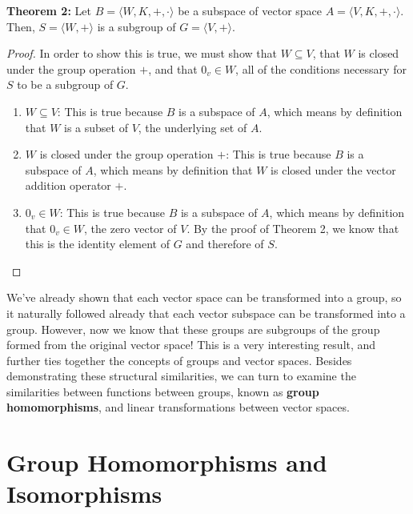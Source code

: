 \documentclass[twoside]{article}
\newcommand{\done}{\renewcommand\qedsymbol{$\blacksquare$}}
\begin{document}
\begin{spacing}{1.25}
\begin{mdframed}[roundcorner=10pt, backgroundcolor=gray!10]
  \textbf{Theorem 2:} Let $B=\langle W,K,+,\cdot\rangle$ be a subspace of 
    vector space $A=\langle V,K,+,\cdot\rangle$. Then, $S=\langle W,+ \rangle$ is a subgroup of
    $G=\langle V,+ \rangle$.
\end{mdframed}
\begin{proof}
    In order to show this is true, we must show that $W\subseteq V$, that 
    $W$ is closed under the group operation $+$, and that $0_v\in W$, 
    all of the conditions necessary for $S$ to be a subgroup of $G$. 
    \begin{enumerate}
      \item $W\subseteq V$: This is true because $B$ is a subspace of $A$, 
      which means by definition that $W$ is a subset of $V$, the underlying set of $A$.
      \item $W$ is closed under the group operation $+$: This is true because 
      $B$ is a subspace of $A$, which means by definition that $W$ is closed under
      the vector addition operator $+$.
      \item $0_v\in W$: This is true because $B$ is a subspace of $A$, which means by definition that
        $0_v\in W$, the zero vector of $V$. By the proof of Theorem 2, we know that 
        this is the identity element of $G$ and therefore of $S$. 
    \end{enumerate}
\done     
\end{proof}

We've already shown that each vector space can be transformed into a group,
so it naturally followed already that each vector subspace can be transformed
into a group. However, now we know that these groups are subgroups of the
group formed from the original vector space! This is a very interesting result,
and further ties together the concepts of groups and vector spaces. Besides 
demonstrating these structural similarities, we can turn to examine the similarities between
functions between groups, known as \textbf{group homomorphisms}, 
and linear transformations between vector spaces.

\section{Group Homomorphisms and Isomorphisms} 


\end{spacing}
\end{document}
